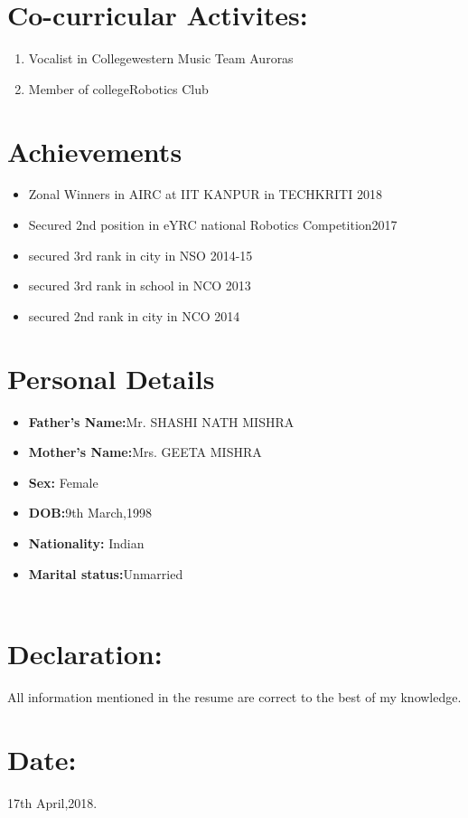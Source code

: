 \documentclass[11pt]{article}
\begin{document}
\section{Co-curricular Activites:}
\begin{enumerate}
\item Vocalist in College{western Music Team Auroras}
\item Member of college{Robotics Club}
\end{enumerate}
\section{Achievements}
\begin{itemize}
\item Zonal Winners in AIRC at IIT KANPUR in TECHKRITI 2018
\item Secured 2nd position in eYRC national Robotics Competition2017
\item secured 3rd rank in city in NSO 2014-15
\item secured 3rd rank in school in NCO 2013
\item secured 2nd rank in city in NCO  2014
\end{itemize}
\section{Personal Details}
\begin{itemize}
\item \textbf{Father's Name:}Mr. SHASHI NATH MISHRA
\newpage
\item \textbf{Mother's Name:}Mrs. GEETA MISHRA

\item \textbf{Sex:} Female
\item\textbf{ DOB:}9th March,1998
\item \textbf{Nationality:} Indian
\item \textbf{Marital status:}Unmarried      \\
\\
\newpage

\end{itemize}
\section{Declaration:}All information mentioned in the resume are correct to the best of my knowledge.\\

\section{Date:}17th April,2018.
\end{document}
